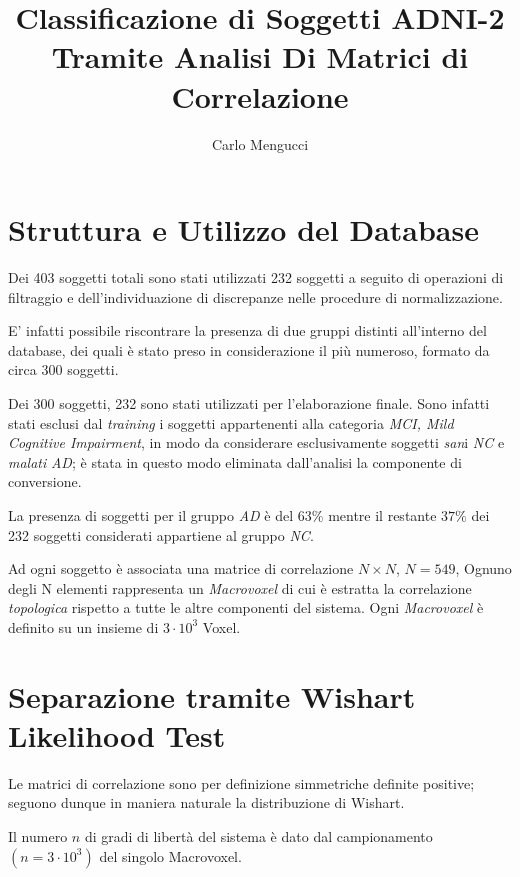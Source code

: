 \documentclass[12pt,openright,a4paper]{article}
\begin{document}
\title{Classificazione di Soggetti ADNI-2 Tramite Analisi Di Matrici di Correlazione}
\author{Carlo Mengucci}

\maketitle

\tableofcontents

\section{Struttura e Utilizzo del Database}

Dei 403 soggetti totali sono stati utilizzati 232 soggetti a seguito di operazioni di filtraggio e dell'individuazione di discrepanze nelle procedure di normalizzazione. 

E' infatti possibile riscontrare la presenza di due gruppi distinti all'interno del database, dei quali è stato preso in considerazione il più numeroso, formato da circa 300 soggetti.

Dei 300 soggetti, 232 sono stati utilizzati per l'elaborazione finale. Sono infatti stati esclusi dal \textit{training} i soggetti appartenenti alla categoria \textit{MCI, Mild Cognitive Impairment}, in modo da considerare esclusivamente soggetti \textit{san}i \textit{NC} e \textit{malati} \textit{AD}; è stata in questo modo eliminata dall'analisi la componente di conversione. 

 La presenza di soggetti per il gruppo \textit{AD} è del $63 \% $ mentre il restante  $37 \%$ dei 232 soggetti considerati appartiene al gruppo \textit{NC}.

Ad ogni soggetto è associata una matrice di correlazione $N\times N$, $N=549$, Ognuno degli N elementi rappresenta un \textit{Macrovoxel} di cui è estratta la correlazione \textit{topologica} rispetto a tutte le altre componenti del sistema. Ogni \textit{Macrovoxel} è definito su un insieme di $3\cdot10^3$ Voxel.

\section{Separazione tramite Wishart Likelihood Test}

Le matrici di correlazione sono per definizione simmetriche definite positive; seguono dunque in maniera naturale la distribuzione di Wishart.

Il numero $n$ di gradi di libertà del sistema è dato dal campionamento $(n=3\cdot 10^3)$ del singolo Macrovoxel.
\end{document}
